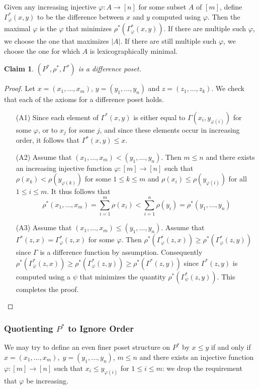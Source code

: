 \documentclass[acmsmall,review,anonymous]{acmart}\settopmatter{printfolios=true,printccs=false,printacmref=false}
\newtheorem{claim}{Claim}
\begin{document}
Given any increasing injective $\varphi : A \longrightarrow [n]$ for some
subset $A$ of $[m]$, define $\Gamma^*_{\varphi}(x, y)$ to be the difference
between $x$ and $y$ computed using $\varphi$. Then the maximal $\varphi$ is the
$\varphi$ that minimizes $\rho^*(\Gamma^*_{\varphi}(x, y))$. If there are
multiple such $\varphi$, we choose the one that maximizes $|A|$. If there are
still multiple such $\varphi$, we choose the one for which $A$ is
lexicographically minimal.
\begin{claim}\label{nocrossingproof}
$(P^*, \rho^*, \Gamma^*)$ is a difference poset.
\end{claim}
\begin{proof}
Let $x = (x_1, \ldots, x_m)$, $y = (y_1, \ldots, y_n)$ and $z = (z_1, \ldots,
z_k)$. We check that each of the axioms for a difference poset holds.
\begin{enumerate}
  \item[(A1)]
  Since each element of $\Gamma^*(x, y)$ is either equal to $\Gamma(x_i,
  y_{\varphi(i)})$ for some $\varphi$, or to $x_j$ for some $j$, and since these
  elements occur in increasing order, it follows that $\Gamma^*(x, y) \leq x$.
  \item[(A2)]
  Assume that $(x_1, \ldots, x_m) < (y_1, \ldots, y_n)$. Then $m \leq
  n$ and there exists an increasing injective function $\varphi:[m]
  \longrightarrow [n]$ such that $\rho(x_k) < \rho(y_{\varphi(k)})$ for some $1
  \leq k \leq m$ and $\rho(x_i) \leq \rho(y_{\varphi(i)})$ for all $1 \leq i
  \leq m$. It thus follows that $$\rho^*(x_1, \ldots, x_m) = \sum_{i=1}^m
  \rho(x_i) < \sum_{i=1}^{n}\rho(y_i) = \rho^*(y_1, \ldots, y_n)$$
  \item[(A3)]
  Assume that $(x_1, \ldots, x_m) \leq (y_1, \ldots, y_n)$. Assume that
  $\Gamma^*(z, x) = \Gamma^*_{\varphi}(z, x)$ for some $\varphi$. Then
  $\rho^*(\Gamma^*_{\varphi} (z, x)) \geq \rho^*(\Gamma^*_{\varphi}(z, y))$
  since $\Gamma$ is a difference function by assumption. Consequently
  $\rho^*(\Gamma^*_{\varphi} (z, x)) \geq \rho^*(\Gamma^*_{\varphi}(z, y)) \geq
  \rho^*(\Gamma^*(z, y))$ since $\Gamma^*(z, y)$ is computed using a $\psi$ that
  minimizes the quantity $\rho^*(\Gamma^*_{\psi}(z, y))$. This completes the
  proof.
\end{enumerate}
\end{proof}
\subsubsection{Quotienting $P^*$ to Ignore Order}
We may try to define an even finer poset structure on $P^*$ by $x \leq y$ if and
only if $x = (x_1, \ldots, x_m), \; y = (y_1, \ldots, y_n)$, $m \leq n$ and
there exists an injective function $\varphi : [m] \longrightarrow [n]$ such
that $x_i \leq y_{\varphi(i)}$ for $1 \leq i \leq m$: we drop the requirement
that $\varphi$ be increasing.
\end{document}
